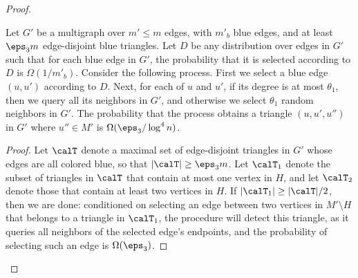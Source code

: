 \begin{proof}

\begin{claim}\label{clm:tri-G-prime}
Let $G'$ be a multigraph over $m' \leq m$ edges, with $m'_b$ blue edges, and 
at least $\eps_3 m$ edge-disjoint blue triangles. 
Let $D$ be any distribution over edges in $G'$ such that for each blue edge in $G'$, the probability that it is selected according to $D$ is %
$\Omega(1/m'_b)$.
Consider the following process.
First we select a blue edge $(u,u')$ according to $D$. 
Next, for each of $u$ and $u'$, if its degree %
is at most $\theta_1$, then we query all its neighbors in $G'$, and otherwise
we select $\theta_1$  random neighbors in $G'$.
 The probability that the process obtains a triangle $(u,u',u'')$ in $G'$ where $u''\in M'$ is 
$\Omega(\eps_3/\log^4 n)$.
\end{claim}

\begin{proof}
Let $\calT$ denote a maximal set of edge-disjoint triangles in $G'$ whose edges are all colored blue, so that $|\calT| \geq \eps_3 m$. Let $\calT_1$ denote the subset of triangles in $\calT$ that contain at most one vertex in $H$, and let $\calT_2$ denote those that contain at least two vertices in $H$. If $|\calT_1| \geq |\calT|/2$, then we are done:  conditioned on selecting an edge between two vertices in $M'\setminus H$ that belongs to a triangle in $\calT_1$, the procedure will detect this triangle, as it queries all neighbors of the selected edge's endpoints, and the probability of selecting such an edge is %
$\Omega(\eps_3)$.


\end{proof}
\end{proof}
